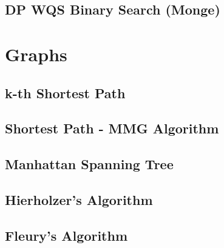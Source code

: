 \subsection{DP WQS Binary Search (Monge)}


\section{Graphs}

% 
% 

\subsection{k-th Shortest Path}


\subsection{Shortest Path - MMG Algorithm}


\subsection{Manhattan Spanning Tree}


\subsection{Hierholzer's Algorithm}


\subsection{Fleury's Algorithm}


